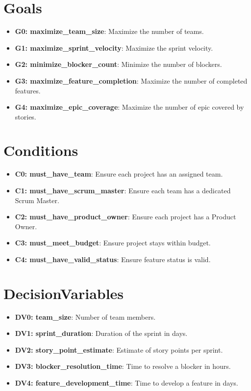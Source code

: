 \documentclass{article}
\begin{document}
\section{Goals}
\begin{itemize}
    \item \textbf{G0: maximize\_team\_size}: Maximize the number of teams.
    \item \textbf{G1: maximize\_sprint\_velocity}: Maximize the sprint velocity.
    \item \textbf{G2: minimize\_blocker\_count}: Minimize the number of blockers.
    \item \textbf{G3: maximize\_feature\_completion}: Maximize the number of completed features.
    \item \textbf{G4: maximize\_epic\_coverage}: Maximize the number of epic covered by stories.
\end{itemize}

\section{Conditions}
\begin{itemize}
    \item \textbf{C0: must\_have\_team}: Ensure each project has an assigned team.
    \item \textbf{C1: must\_have\_scrum\_master}: Ensure each team has a dedicated Scrum Master.
    \item \textbf{C2: must\_have\_product\_owner}: Ensure each project has a Product Owner.
    \item \textbf{C3: must\_meet\_budget}: Ensure project stays within budget.
    \item \textbf{C4: must\_have\_valid\_status}: Ensure feature status is valid.
\end{itemize}

\section{DecisionVariables}
\begin{itemize}
    \item \textbf{DV0: team\_size}: Number of team members.
    \item \textbf{DV1: sprint\_duration}: Duration of the sprint in days.
    \item \textbf{DV2: story\_point\_estimate}: Estimate of story points per sprint.
    \item \textbf{DV3: blocker\_resolution\_time}: Time to resolve a blocker in hours.
    \item \textbf{DV4: feature\_development\_time}: Time to develop a feature in days.
\end{itemize}
\end{document}
